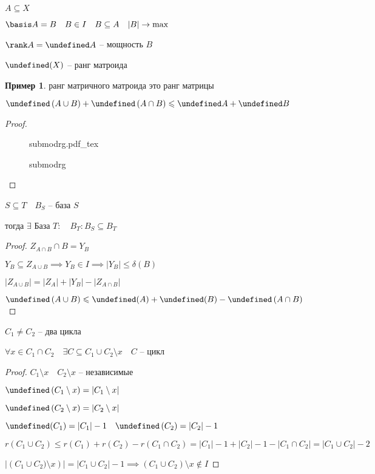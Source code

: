 \documentclass{book}
\theoremstyle{definition}
\newtheorem*{example}{Пример}
\newcommand{\incfig}[1]{%
    \def\svgwidth{\columnwidth}
    {#1.pdf_tex}
}
\let\r\undefined
\begin{document}
\begin{definition}
    $A\subseteq X$

    $\basis A = B\quad B\in I\quad B\subseteq A\quad |B|\to \max$
    
    $\rank A = \r A$ -- мощность  $B$ 

    $\r(X)$ -- ранг матроида
\end{definition}

\begin{example}
    ранг матричного матроида это ранг матрицы
\end{example}

\begin{theorem}

    $\r\left( A\cup B \right)  + \r\left( A\cap B \right) \leqslant \r A + \r B$
\end{theorem}
\begin{proof}
\begin{figure}[!ht]
    \centering
    \incfig{submodrg}
    \caption{submodrg}
    \label{fig:submodrg}
\end{figure}
\end{proof}

\begin{lemma}

    $S\subseteq T\quad B_S$ -- база $S$

    тогда  $\exists $ База $T:\quad B_T:B_S\subseteq B_T$
\end{lemma}
\begin{proof}
    $Z_{A\cap B}\cap B = Y_B$

    $Y_B \subseteq Z_{A\cup B} \implies Y_B\in I \implies \left| Y_B \right| \leqslant \delta(B)$

    $\left| Z_{A\cup B} \right| = \left| Z_A \right|  + \left| Y_B \right|  - \left| Z_{A\cap B} \right| $ 

    $\r\left( A\cup B \right) \leqslant \r(A) + \r(B) - \r\left( A\cap B \right) $
\end{proof}

\begin{theorem}
    [О циклах]

    $C_1 \neq  C_2$ -- два цикла

    $\forall x\in C_1\cap C_2\quad \exists C\subseteq C_1\cup C_2\setminus x\quad C$ -- цикл
\end{theorem}
\begin{proof}
    $C_1\setminus x\quad C_2\setminus x$ -- независимые

    $\r\left( C_1\setminus x \right)  = \left| C_1\setminus x \right| $

    $\r\left( C_2\setminus x \right)  = \left| C_2\setminus x \right| $

    $\r(C_1) = |C_1| - 1\quad \r\left(C_2  \right)  = |C_2| -1 $

    $r\left( C_1\cup C_2 \right) \leqslant r(C_1) + r(C_2) - r\left( C_1\cap C_2 \right)  = |C_1| - 1 + |C_2| - 1 - |C_1\cap C_2| = |C_1\cup C_2| - 2$

    $\left| \left( C_1\cup C_2)\setminus x \right)  \right|  = \left| C_1\cup C_2 \right|   -1 \implies \left( C_1\cup C_2 \right) \setminus x\not\in I$
\end{proof}
\end{document}
